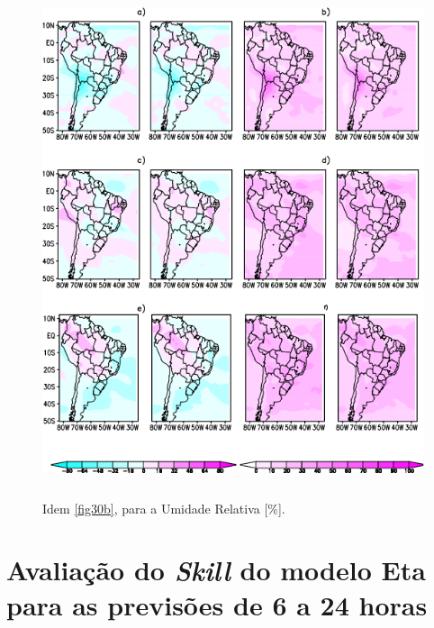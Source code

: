 \break

\begin{figure}[!h]
\centering
\includegraphics[height=15cm]{./figs/campo_vies_eqm-umrl.png}
\caption{Idem \autoref{fig30b}, para a Umidade Relativa [\%].}
\label{fig34b}
\end{figure}

\break

\section{Avaliação do \textit{Skill} do modelo Eta para as previsões de 6 a 24 horas}
\label{ss:avalskill}

